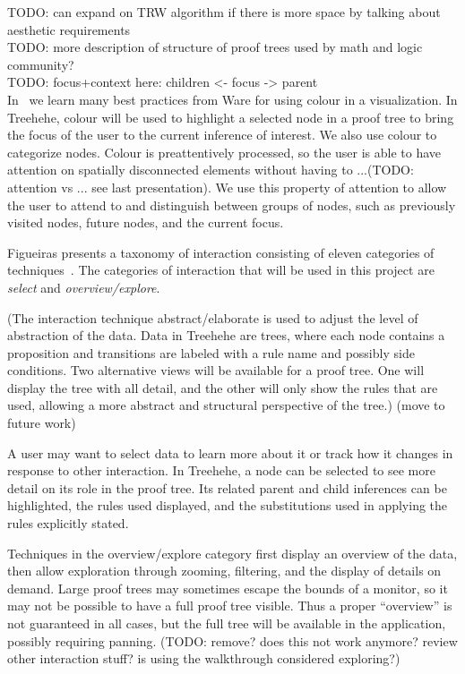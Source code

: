 \documentclass[conference]{IEEEtran}
\newcommand{\projectname}{Treehehe}
\begin{document}
TODO: can expand on TRW algorithm if there is more space by talking about aesthetic requirements \\

TODO: more description of structure of proof trees used by math and logic community? \\

TODO: focus+context here: children <- focus -> parent \\

In~\cite{infovis-ware} we learn many best practices from Ware for using colour in a visualization. In \projectname{}, colour will be used to highlight a selected node in a proof tree to bring the focus of the user to the current inference of interest. We also use colour to categorize nodes. Colour is preattentively processed, so the user is able to have attention on spatially disconnected elements without having to ...(TODO: attention vs ... see last presentation). We use this property of attention to allow the user to attend to and distinguish between groups of nodes, such as previously visited nodes, future nodes, and the current focus.

Figueiras presents a taxonomy of interaction consisting of eleven categories of techniques~\cite{interaction-figueiras}. The categories of interaction that will be used in this project are \textit{select} and \textit{overview/explore}.

(The interaction technique abstract/elaborate is used to adjust the level of abstraction of the data. Data in \projectname{} are trees, where each node contains a proposition and transitions are labeled with a rule name and possibly side conditions. Two alternative views will be available for a proof tree. One will display the tree with all detail, and the other will only show the rules that are used, allowing a more abstract and structural perspective of the tree.) (move to future work)

A user may want to select data to learn more about it or track how it changes in response to other interaction. In \projectname{}, a node can be selected to see more detail on its role in the proof tree. Its related parent and child inferences can be highlighted, the rules used displayed, and the substitutions used in applying the rules explicitly stated.

Techniques in the overview/explore category first display an overview of the data, then allow exploration through zooming, filtering, and the display of details on demand. Large proof trees may sometimes escape the bounds of a monitor, so it may not be possible to have a full proof tree visible. Thus a proper ``overview'' is not guaranteed in all cases, but the full tree will be available in the application, possibly requiring panning. (TODO: remove? does this not work anymore? review other interaction stuff? is using the walkthrough considered exploring?)
\end{document}
